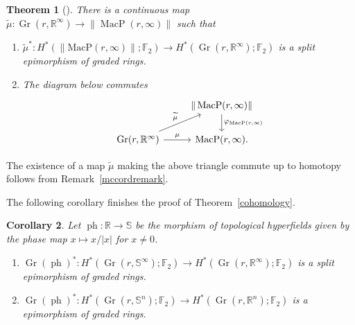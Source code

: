 \documentclass[10pt, preprint]{article}
\newtheorem{theorem}{Theorem}[section]
\newtheorem{corollary}[theorem]{Corollary}
\theoremstyle{definition}
\begin{document}
\begin{theorem}[\cite{Anderson-Davis}]
\label{AD}
There is a continuous map ${\widetilde{\mu }}: \operatorname{Gr}(r,
\mathbb{R}^{\infty }) \to \|\operatorname{MacP}(r,\infty )\|$ such that
%
\begin{enumerate}[\textit{2.}]%
\item[\textit{1.}]
${\widetilde{\mu }}^{*} : H^{*}(\|\mathrm{MacP}(r,\infty )\|;
\mathbb{F}_{2}) \to H^{*}(\operatorname{Gr}(r,\mathbb{R}^{\infty });
\mathbb{F}_{2})$ is a split epimorphism of graded rings.
%
\item[\textit{2.}]
The diagram below commutes
%
\begin{equation*}
%
\begin{tikzcd}
&\|\operatorname{MacP} (r,\infty )\| \arrow[d, "\varphi _{\operatorname{MacP} (r,\infty )}"]\\
\operatorname{Gr} (r,\mathbb R^\infty ) \arrow[r, "\mu "] \arrow[ru,
"{\widetilde{\mu }}"] & \operatorname{MacP} (r, \infty ).
\end{tikzcd}
%
\end{equation*}
%
\end{enumerate}
%
\end{theorem}

The existence of a map ${\widetilde{\mu }}$ making the above triangle
commute up to homotopy follows from Remark~\ref{mccordremark}.

The following corollary finishes the proof of Theorem~\ref{cohomology}.

\begin{corollary}
Let $\operatorname{ph}: \mathbb{R}\to \mathbb{S}$ be the morphism of
topological hyperfields given by the phase map $x \mapsto x/|x|$ for
$x \neq 0$.
%
\begin{enumerate}[\textit{2.}]%
\item[\textit{1.}]
$\operatorname{Gr}(\operatorname{ph})^{*} : H^{*}(\operatorname{Gr}(r,
\mathbb{S}^{\infty });\mathbb{F}_{2}) \to H^{*}(\operatorname{Gr}(r,
\mathbb{R}^{\infty });\mathbb{F}_{2}) $ is a split epimorphism of graded
rings.
%
\item[\textit{2.}]
$\operatorname{Gr}(\operatorname{ph})^{*} : H^{*}(\operatorname{Gr}(r,
\mathbb{S}^{n});\mathbb{F}_{2}) \to H^{*}(\operatorname{Gr}(r,
\mathbb{R}^{n});\mathbb{F}_{2}) $ is a epimorphism of graded rings.
\end{enumerate}
%
\end{corollary}
\end{document}
